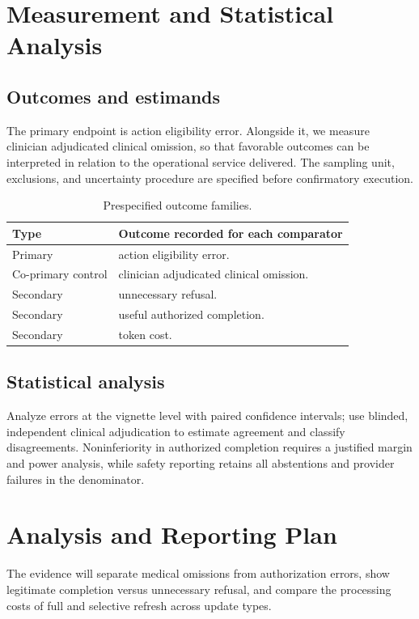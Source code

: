 \documentclass[11pt,a4paper]{article}
\begin{document}
\section{Measurement and Statistical Analysis}
\subsection{Outcomes and estimands}
The primary endpoint is action eligibility error. Alongside it, we measure clinician adjudicated clinical omission, so that favorable outcomes can be interpreted in relation to the operational service delivered. The sampling unit, exclusions, and uncertainty procedure are specified before confirmatory execution.
\begin{table}[ht]
\centering\footnotesize
\caption{Prespecified outcome families.}
\begin{tabularx}{\linewidth}{@{}lX@{}}\toprule
Type & Outcome recorded for each comparator \\ \midrule
Primary & action eligibility error. \\ 
Co-primary control & clinician adjudicated clinical omission. \\ 
Secondary & unnecessary refusal. \\ 
Secondary & useful authorized completion. \\ 
Secondary & token cost. \\ 
\bottomrule\end{tabularx}
\end{table}

\subsection{Statistical analysis}
Analyze errors at the vignette level with paired confidence intervals; use blinded, independent clinical adjudication to estimate agreement and classify disagreements. Noninferiority in authorized completion requires a justified margin and power analysis, while safety reporting retains all abstentions and provider failures in the denominator.

\section{Analysis and Reporting Plan}
The evidence will separate medical omissions from authorization errors, show legitimate completion versus unnecessary refusal, and compare the processing costs of full and selective refresh across update types.
\end{document}
